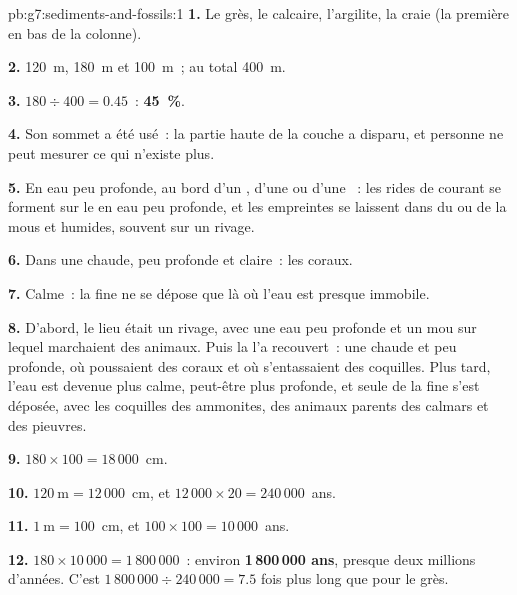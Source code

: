 \begin{solution}{pb:g7:sediments-and-fossils:1}
\textbf{1.} Le grès, le calcaire, l'argilite, la craie (la première en
bas de la colonne).

\textbf{2.} \qty{120}{m}, \qty{180}{m} et \qty{100}{m}~; au total
\qty{400}{m}.

\textbf{3.} $180 \div 400 = 0.45$~: \textbf{45~\%}.

\textbf{4.} Son sommet a été usé~: la partie haute de la couche a disparu,
et personne ne peut mesurer ce qui n'existe plus.

\textbf{5.} En eau peu profonde, au bord d'un , d'une  ou d'une
~: les rides de courant se forment sur le  en eau peu profonde, et
les empreintes se laissent dans du  ou de la  mous et humides,
souvent sur un rivage.

\textbf{6.} Dans une  chaude, peu profonde et claire~: les coraux.

\textbf{7.} Calme~: la  fine ne se dépose que là où l'eau est presque immobile.

\textbf{8.} D'abord, le lieu était un rivage, avec une eau peu profonde et
un  mou sur lequel marchaient des animaux. Puis la  l'a recouvert~:
une  chaude et peu profonde, où poussaient des coraux et où
s'entassaient des coquilles. Plus tard, l'eau est devenue plus calme,
peut-être plus profonde, et seule de la  fine s'est déposée, avec les
coquilles des ammonites, des animaux parents des calmars et des pieuvres.

\textbf{9.} $180 \times 100 = 18\,000$~cm.

\textbf{10.} $120~\text{m} = 12\,000$~cm, et $12\,000 \times 20 =
240\,000$~ans.

\textbf{11.} $1~\text{m} = 100$~cm, et $100 \times 100 = 10\,000$~ans.

\textbf{12.} $180 \times 10\,000 = 1\,800\,000$~: environ
\textbf{1\,800\,000 ans}, presque deux millions d'années. C'est
$1\,800\,000 \div 240\,000 = 7.5$ fois plus long que pour le grès.
\end{solution}
